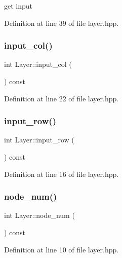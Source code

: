 get input 



Definition at line 39 of file layer.\+hpp.

\mbox{\label{class_layer_aa015026eb20766feb1256b1f1a17debc}} 
\subsubsection{\texorpdfstring{input\+\_\+col()}{input\_col()}}
{\footnotesize\ttfamily int Layer\+::input\+\_\+col (\begin{DoxyParamCaption}{ }\end{DoxyParamCaption}) const}



Definition at line 22 of file layer.\+hpp.

\mbox{\label{class_layer_a030a6c0b038cf4c7d9125c49dd0d98bd}} 
\subsubsection{\texorpdfstring{input\+\_\+row()}{input\_row()}}
{\footnotesize\ttfamily int Layer\+::input\+\_\+row (\begin{DoxyParamCaption}{ }\end{DoxyParamCaption}) const}



Definition at line 16 of file layer.\+hpp.

\mbox{\label{class_layer_a2f19878482d098654fb084b9c21b72ed}} 
\subsubsection{\texorpdfstring{node\+\_\+num()}{node\_num()}}
{\footnotesize\ttfamily int Layer\+::node\+\_\+num (\begin{DoxyParamCaption}{ }\end{DoxyParamCaption}) const}



Definition at line 10 of file layer.\+hpp.

